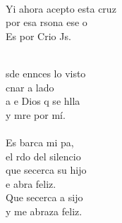 \begin{cancion}
	\jump\\
	Yi ahora acepto esta cruz\\
	 por esa rsona ese o\\
	Es por Crio Js. \\\jump\\
	\begin{chorus}%
	sde ennces lo  visto\\
	cnar a  lado\\
	a e Dios q se hlla\\
	y mre por mí.\\
\jump\\
	Es  barca  mi pa,\\
	el rdo del silencio\\
	que secerca su hijo\\
	e abra feliz.\\
	Que secerca a sijo\\
y me abraza feliz.\\
	\end{chorus}%
	\jump\\
\end{cancion}%
